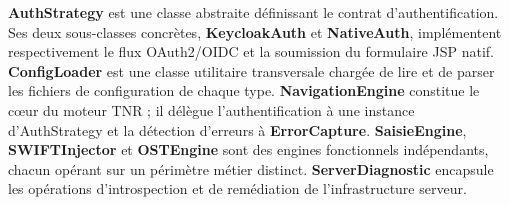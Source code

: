 \documentclass[12pt, a4paper]{report}
\begin{document}
\textbf{AuthStrategy} est une classe abstraite définissant le contrat d'authentification. Ses deux sous-classes concrètes, \textbf{KeycloakAuth} et \textbf{NativeAuth}, implémentent respectivement le flux OAuth2/OIDC et la soumission du formulaire JSP natif. \textbf{ConfigLoader} est une classe utilitaire transversale chargée de lire et de parser les fichiers de configuration de chaque type. \textbf{NavigationEngine} constitue le c\oe{}ur du moteur TNR ; il délègue l'authentification à une instance d'AuthStrategy et la détection d'erreurs à \textbf{ErrorCapture}. \textbf{SaisieEngine}, \textbf{SWIFTInjector} et \textbf{OSTEngine} sont des engines fonctionnels indépendants, chacun opérant sur un périmètre métier distinct. \textbf{ServerDiagnostic} encapsule les opérations d'introspection et de remédiation de l'infrastructure serveur.
\end{document}
